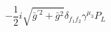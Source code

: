 %
\begin{dmath*}
%
  -  \frac{1}{2} i \sqrt{{\bar g}^{\prime 2} + {\bar g}{}^2}\delta_{f_1 f_2} \gamma^{\mu_3} P_L
%
\end{dmath*}
%
